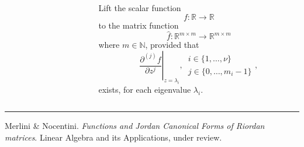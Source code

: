 \documentclass[9pt]{beamer}
\begin{document}
\begin{frame}[fragile]
\begin{columns}
\begin{column}{0.6\textwidth}
\begin{displaymath}
        \end{displaymath}
    \end{column}
    \begin{column}{0.4\textwidth}
    Lift the scalar function $$f: \mathbb{R} \rightarrow \mathbb{R}$$
    to the matrix function
    $$\hat{f}: \mathbb{R}^{m\times m} \rightarrow \mathbb{R}^{m\times m}$$
    where $m\in\mathbb{N}$, provided that
    \begin{displaymath}
        \left. \frac{\partial^{(j)}{f}}{\partial{z}^{j}} \right|_{z=\lambda_{i}},\,
        \begin{array}{l}
            i\in \lbrace 1, \ldots, \nu \rbrace \\
            j \in \lbrace 0, \ldots, m_{i}-1 \rbrace
        \end{array},
    \end{displaymath}
    exists, for each eigenvalue $\lambda_{i}$.
    \end{column}
\end{columns}
\vfill
\noindent\rule{\textwidth}{0.1pt}
{\footnotesize
Merlini \& Nocentini. \textit{Functions and Jordan Canonical Forms of Riordan
matrices}. \newline Linear Algebra and its Applications, under review.}
\end{frame}
\end{document}
